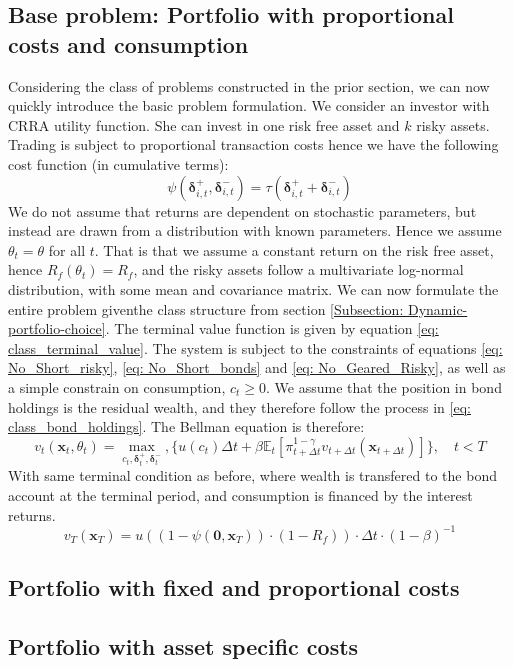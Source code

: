 \documentclass[11pt]{article}
\begin{document}
\subsection{Base problem: Portfolio with proportional costs and consumption}\label{Subsection: Base_Problem}
Considering the class of problems constructed in the prior section,
we can now quickly introduce the basic problem formulation.
We consider an investor with CRRA utility function. She can invest in one risk free asset and $k$ risky assets.
Trading is subject to proportional transaction costs hence we have the following cost function (in cumulative terms):
\begin{equation} \label{eq: base_model_transaction-cost}
  \psi (\boldsymbol{\delta}^{+}_{i,t}, \boldsymbol{\delta}^{-}_{i,t} ) = \tau (\boldsymbol{\delta}^{+}_{i,t} + \boldsymbol{\delta}^{-}_{i,t}) 
\end{equation}
We do not assume that returns are dependent on stochastic parameters, but instead are drawn from a distribution with known parameters.
Hence we assume \( \theta_{t} = \theta \) for all $t$. That is that we assume a constant return on the risk free asset, hence $R_{f}(\theta_t) = R_{f}$,
and the risky assets follow a multivariate log-normal distribution, with some mean and covariance matrix.
We can now formulate the entire problem giventhe class structure from section \ref{Subsection: Dynamic-portfolio-choice}.
The terminal value function is given by equation \eqref{eq: class_terminal_value}. 
The system is subject to the constraints of equations \eqref{eq: No_Short_risky}, \eqref{eq: No_Short_bonds} and \eqref{eq: No_Geared_Risky},
as well as a simple constrain on consumption, $c_t \geq 0$.
We assume that the position in bond holdings is the residual wealth, and they therefore follow the process
in \eqref{eq: class_bond_holdings}. The Bellman equation is therefore:
\[  
  v_{t} (\mathbf{x}_{t}, \theta_t) = \max_{c_t , \boldsymbol{\delta}^{+}_{t}, \boldsymbol{\delta}^{-}_{t}  },  \{ u(c_t) 
  \Delta t + \beta \mathbb{E}_{t} \left[ 
    \pi_{t+\Delta t}^{1-\gamma}
    v_{t+\Delta t} (\mathbf{x}_{t+\Delta t }) 
    \right] \} , \quad t < T 
\]
With same terminal condition as before, where wealth is transfered to the bond account at the terminal period, 
and consumption is financed by the interest returns.
\[
  v_T (\mathbf{x}_T) = u ( (1 - \psi( \mathbf{0},\mathbf{x}_T)) \cdot (1-R_f) )\cdot \Delta t \cdot (1-\beta)^{-1} 
\]

\subsection{Portfolio with fixed and proportional costs}
\subsection{Portfolio with asset specific costs}


\ifdefined\COMPILINGMAIN
\else
\printbibliography
\end{document}
